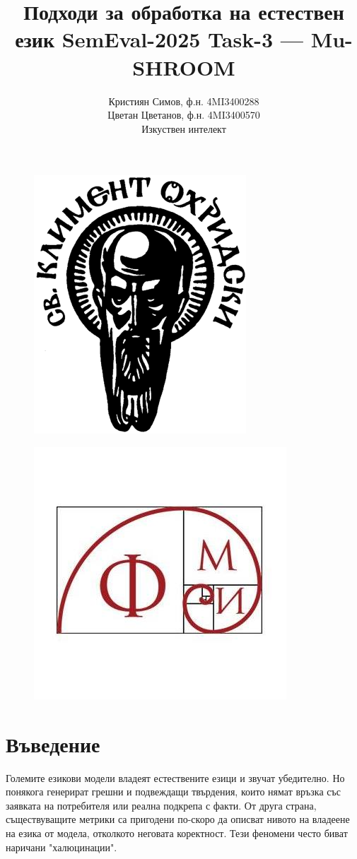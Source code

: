\documentclass[12pt]{article}
\begin{document}
	
	\title{ Подходи за обработка на естествен език \newline SemEval-2025 Task-3 — Mu-SHROOM  \newline}
	
	
	\author{Кристиян Симов, ф.н. 4MI3400288 \\ Цветан Цветанов, ф.н. 4MI3400570 \\ Изкуствен интелект}
	\maketitle
	
		\begin{figure}[H]
			\centering
			\includegraphics[width=0.25\linewidth]{clement-ohrid-logo.png}
		\end{figure}
		
		\begin{figure}[H]
			\centering
			\includegraphics[width=0.25\linewidth]{fmi-logo.jpg}
		\end{figure}
	
	
	\vspace{0.5in}
	\pagebreak
	
	\section{Въведение}
	
	Големите езикови модели владеят естествените езици и звучат убедително. Но понякога генерират грешни и подвеждащи твърдения,  които нямат връзка със заявката на потребителя  или реална подкрепа с факти.  От друга страна, съществуващите метрики са пригодени по-скоро да  описват  нивото на владеене на езика от модела, отколкото неговата коректност. Тези феномени често биват наричани "халюцинации". \newline
	
\end{document}
